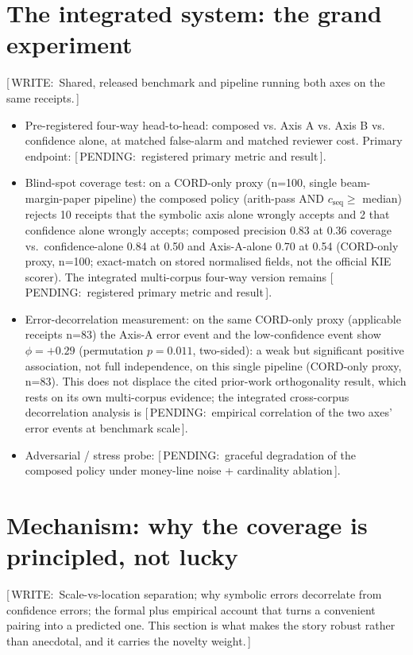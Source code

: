 \documentclass[10pt,twocolumn,a4paper]{article}
\newcommand{\pending}[1]{{\small\sffamily\color{pendingclr}[\,PENDING:\ #1\,]}}
\newcommand{\todo}[1]{{\small\sffamily\color{writeclr}[\,WRITE:\ #1\,]}}
\begin{document}
\section{The integrated system: the grand experiment}
\label{sec:integrated}
\todo{Shared, released benchmark and pipeline running both axes on the same
receipts.}
\begin{itemize}
  \item Pre-registered four-way head-to-head: composed vs. Axis A vs. Axis B
  vs. confidence alone, at matched false-alarm and matched reviewer cost.
  Primary endpoint: \pending{registered primary metric and result}.
  \item Blind-spot coverage test: on a CORD-only proxy (n=100, single
  beam-margin-paper pipeline) the composed policy (arith-pass AND
  $c_{\mathrm{seq}}\!\ge\!$ median) rejects 10 receipts that the symbolic
  axis alone wrongly accepts and 2 that confidence alone wrongly accepts;
  composed precision 0.83 at 0.36 coverage vs.\ confidence-alone 0.84 at
  0.50 and Axis-A-alone 0.70 at 0.54 (CORD-only proxy, n=100; exact-match
  on stored normalised fields, not the official KIE scorer). The integrated
  multi-corpus four-way version remains \pending{registered primary metric
  and result}.
  \item Error-decorrelation measurement: on the same CORD-only proxy
  (applicable receipts n=83) the Axis-A error event and the low-confidence
  event show $\phi=+0.29$ (permutation $p=0.011$, two-sided): a weak but
  significant positive association, not full independence, on this single
  pipeline (CORD-only proxy, n=83). This does not displace the cited
  prior-work orthogonality result, which rests on its own multi-corpus
  evidence; the integrated cross-corpus decorrelation analysis is
  \pending{empirical correlation of the two axes' error events at benchmark scale}.
  \item Adversarial / stress probe: \pending{graceful degradation of the composed policy under money-line noise + cardinality ablation}.
\end{itemize}

\section{Mechanism: why the coverage is principled, not lucky}
\label{sec:mechanism}
\todo{Scale-vs-location separation; why symbolic errors decorrelate from
confidence errors; the formal plus empirical account that turns a convenient
pairing into a predicted one. This section is what makes the story robust
rather than anecdotal, and it carries the novelty weight.}
\end{document}
